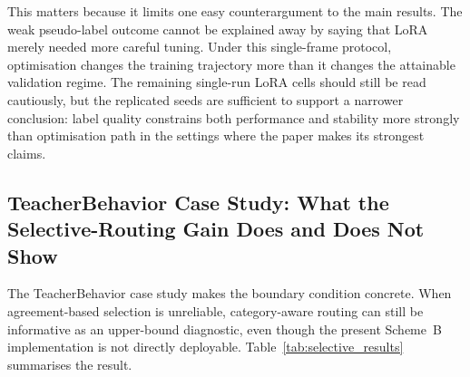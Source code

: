 \documentclass{ieeeaccess}
\begin{document}
This matters because it limits one easy counterargument to the main
results.
The weak pseudo-label outcome cannot be explained away by saying that
LoRA merely needed more careful tuning.
Under this single-frame protocol, optimisation changes the
training trajectory more than it changes the attainable validation
regime.
The remaining single-run LoRA cells should still be read cautiously,
but the replicated seeds are sufficient to support a narrower
conclusion: label quality constrains both performance and stability
more strongly than optimisation path in the settings where the paper
makes its strongest claims.

\subsection{TeacherBehavior Case Study: What the Selective-Routing
Gain Does and Does Not Show}

The TeacherBehavior case study makes the boundary condition concrete.
When agreement-based selection is unreliable, category-aware routing
can still be informative as an upper-bound diagnostic, even though the
present Scheme~B implementation is not directly deployable.
Table~\ref{tab:selective_results} summarises the result.

\begin{table}[!t]
\caption{Comparison of annotation strategies on TeacherBehavior
(validation accuracy, \%). The selective strategy uses pseudo-labels
for high-anchor classes and zero-shot CLIP for low-anchor classes.
High-anchor: blackboard-writing, teacher, screen, blackboard.
Low-anchor: guide, answer, on-stage interaction, stand.
The zero-shot baseline in this table uses the prompt-ensemble setting.
\textbf{Selective routing uses ground-truth category as oracle routing
variable at evaluation time and represents a diagnostic upper bound,
not a deployable pipeline or a deployable-method comparison.}}
\label{tab:selective_results}
\centering
{}
\end{table}
\end{document}
